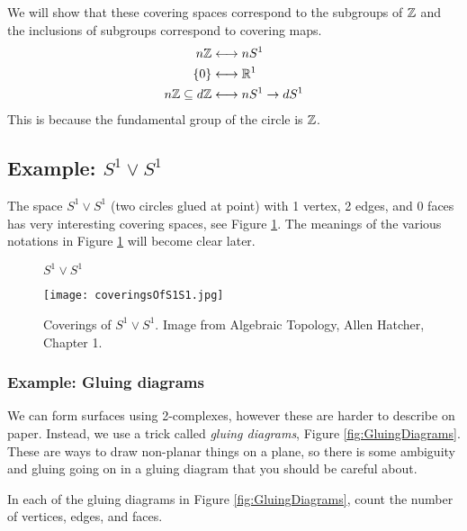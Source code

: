   We will show that these covering spaces correspond to the subgroups of $\bbz$ and the inclusions of subgroups correspond to covering maps.
  \begin{align*}
    n \bbz &\longleftrightarrow nS^1 \\
    \set{0} &\longleftrightarrow \bbr^1 \\
    n \bbz \subseteq d \bbz &\longleftrightarrow nS^1 \rightarrow dS^1
  \end{align*}
  This is because the fundamental group of the circle is $\bbz$.


  \subsection{Example: $S^1 \vee S^1$}
  The space $S^1 \vee S^1$ (two circles glued at point) with 1 vertex, 2 edges, and 0 faces has very interesting covering spaces, see Figure \ref{fig:CoveringsOfS1S1}. The meanings of the various notations in Figure \ref{fig:CoveringsOfS1S1} will become clear later.
  \begin{figure}[H]
  \centering
    \begin{tikzpicture}[thick, scale=0.75]
      
    \end{tikzpicture}
    \caption{$S^1 \vee S^1$}
  \end{figure}

  \begin{figure}[p]
  \centering
    \texttt{[image: coveringsOfS1S1.jpg]}
    \caption{Coverings of $S^1 \vee S^1$. Image from Algebraic Topology, Allen Hatcher, Chapter 1.}
    \label{fig:CoveringsOfS1S1}
  \end{figure}






  \subsubsection{Example: Gluing diagrams}
  We can form surfaces using 2-complexes, however these are harder to describe on paper.
  Instead, we use a trick called \emph{gluing diagrams}, Figure \ref{fig:GluingDiagrams}.
  These are ways to draw non-planar things on a plane, so there is some ambiguity and gluing going on in a gluing diagram that you should be careful about.

  \begin{qbox}
    In each of the gluing diagrams in Figure \ref{fig:GluingDiagrams}, count the number of vertices, edges, and faces.
  \end{qbox}

